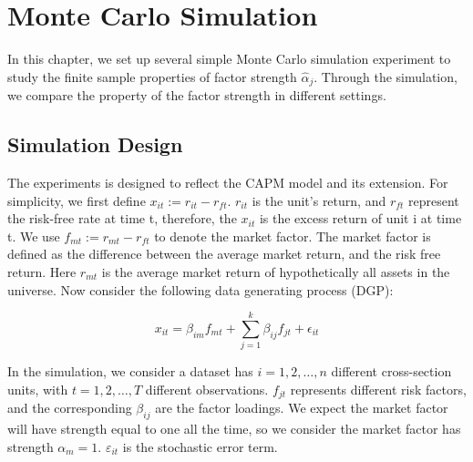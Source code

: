 \chapter{Monte Carlo Simulation}\label{MC}
	In this chapter, we set up several simple Monte Carlo simulation experiment to study the finite sample properties of factor strength $\hat{\alpha}_j$.
	Through the simulation, we compare the property of the factor strength in different settings.
	
\section{Simulation Design}
The experiments is designed to reflect the CAPM model and its extension.
For simplicity, we first define $x_{it} := r_{it}- r_{ft}$.
$r_{it}$ is the unit's return, and $r_{ft}$ represent the risk-free rate at time t, therefore, the $x_{it}$ is the excess return of unit i at time t.
We use $f_{mt}:=r_{mt} - r_{ft}$ to denote the market factor.
The market factor is defined as the difference between the average market return, and the risk free return.
Here $r_{mt}$ is the average market return of hypothetically all assets in the universe.
Now consider the following data generating process (DGP):
	
		\[ x_{it} = \beta_{im}f_{mt} +  \sum_{j=1}^k\beta_{ij}f_{jt} +\epsilon_{it}  \]
	


In the simulation, we consider a dataset has $i = 1, 2,\dots, n$ different cross-section units, with $t= 1, 2,\dots, T$ different observations. 
$f_{jt}$ represents different risk factors, and the corresponding  $\beta_{ij}$ are the factor loadings.
We expect the market factor will have strength equal to one all the time, so we consider the market factor has strength $\alpha_m = 1$.
$\varepsilon_{it}$ is the stochastic error term.


